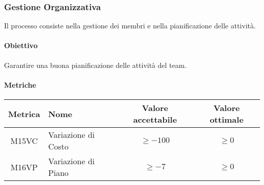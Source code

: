 \subsubsection{Gestione Organizzativa}
Il processo consiste nella gestione dei membri e nella pianificazione delle attività.
\paragraph{Obiettivo} \hfill \break
Garantire una buona pianificazione delle attività del team.

\paragraph{Metriche}
\begin{center}
    \renewcommand{\arraystretch}{1.8}
    \begin{tabular}{ |c|m{12em}|c|c|}
        \hline
        \textbf{Metrica} & \textbf{Nome} & \textbf{Valore accettabile} & \textbf{Valore ottimale} \\
        \hline
        M15VC & Variazione di Costo & $ \geq -100 $ & $ \geq 0 $  \\
        \hline
        M16VP & Variazione di Piano & $ \geq -7 $ & $ \geq 0 $\\
        \hline
    \end{tabular}
\end{center}